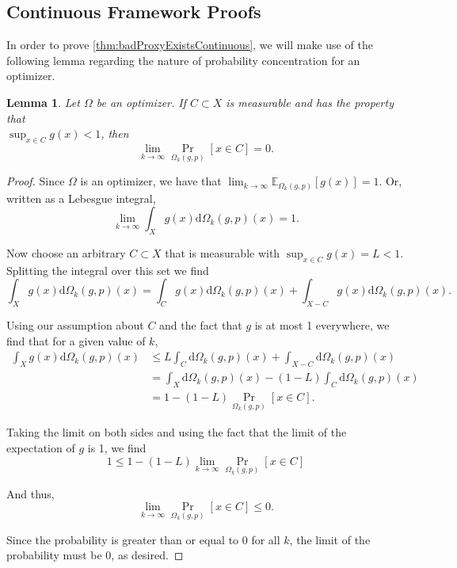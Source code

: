 \documentclass{article}
\newtheorem{Lemma}{Lemma}[section] \crefname{Lemma}{Lemma}{Lemmas}
\begin{document}
\subsection{Continuous Framework Proofs}
In order to prove \cref{thm:badProxyExistsContinuous}, we will make use of the following lemma regarding the nature of probability concentration for an optimizer.

\begin{Lemma} \label{lem:continuousLemma}
Let $\Omega$ be an optimizer. If $C \subset X$ is measurable and has the property that \\ $\sup_{x \in C} g(x) < 1$, then
$$\lim_{k \rightarrow \infty} \Pr_{\Omega_k(g, p)}[x \in C] = 0.$$
\end{Lemma}
\begin{proof}
Since $\Omega$ is an optimizer, we have that $\lim_{k \rightarrow \infty} \mathbb E_{\Omega_k(g,p)}[g(x)] = 1$. Or, written as a Lebesgue integral,
$$\lim_{k \rightarrow \infty} \int_{X} g(x) \mathrm d \Omega_k(g,p)(x) = 1.$$

Now choose an arbitrary $C \subset X$ that is measurable with $\sup_{x \in C} g(x) = L < 1$. Splitting the integral over this set we find
$$\int_{X} g(x) \mathrm d \Omega_k(g,p)(x) = \int_{C} g(x)  \mathrm d\Omega_k(g,p)(x) + \int_{X-C} g(x) \mathrm d\Omega_k(g,p)(x).$$

Using our assumption about $C$ and the fact that $g$ is at most 1 everywhere, we find that for a given value of $k$,
\begin{align*}
\int_{X} g(x) \mathrm d \Omega_k(g,p)(x) &\leq L\int_{C} \mathrm d \Omega_k(g,p)(x) + \int_{X-C} \mathrm d \Omega_k(g,p)(x) \\
&= \int_{X} \mathrm d \Omega_k(g,p)(x) - (1-L)\int_{C} \mathrm d \Omega_k(g,p)(x) \\
&= 1 - (1-L) \Pr_{\Omega_k(g,p)}[x \in C].
\end{align*}

Taking the limit on both sides and using the fact that the limit of the expectation of $g$ is 1, we find
$$1 \leq 1 - (1-L) \lim_{k \rightarrow \infty} \Pr_{\Omega_k(g,p)}[x \in C]$$

And thus,
$$\lim_{k \rightarrow \infty} \Pr_{\Omega_k(g,p)}[x \in C] \leq 0.$$

Since the probability is greater than or equal to 0 for all $k$, the limit of the probability must be 0, as desired.
\end{proof}
\end{document}
